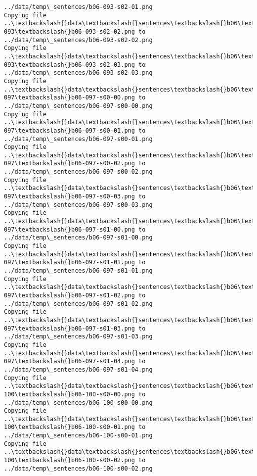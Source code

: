 \documentclass[11pt]{article}
\begin{document}
\begin{Verbatim}[commandchars=\\\{\}]
../data/temp\_sentences/b06-093-s02-01.png
Copying file ..\textbackslash{}data\textbackslash{}sentences\textbackslash{}b06\textbackslash{}b06-093\textbackslash{}b06-093-s02-02.png to
../data/temp\_sentences/b06-093-s02-02.png
Copying file ..\textbackslash{}data\textbackslash{}sentences\textbackslash{}b06\textbackslash{}b06-093\textbackslash{}b06-093-s02-03.png to
../data/temp\_sentences/b06-093-s02-03.png
Copying file ..\textbackslash{}data\textbackslash{}sentences\textbackslash{}b06\textbackslash{}b06-097\textbackslash{}b06-097-s00-00.png to
../data/temp\_sentences/b06-097-s00-00.png
Copying file ..\textbackslash{}data\textbackslash{}sentences\textbackslash{}b06\textbackslash{}b06-097\textbackslash{}b06-097-s00-01.png to
../data/temp\_sentences/b06-097-s00-01.png
Copying file ..\textbackslash{}data\textbackslash{}sentences\textbackslash{}b06\textbackslash{}b06-097\textbackslash{}b06-097-s00-02.png to
../data/temp\_sentences/b06-097-s00-02.png
Copying file ..\textbackslash{}data\textbackslash{}sentences\textbackslash{}b06\textbackslash{}b06-097\textbackslash{}b06-097-s00-03.png to
../data/temp\_sentences/b06-097-s00-03.png
Copying file ..\textbackslash{}data\textbackslash{}sentences\textbackslash{}b06\textbackslash{}b06-097\textbackslash{}b06-097-s01-00.png to
../data/temp\_sentences/b06-097-s01-00.png
Copying file ..\textbackslash{}data\textbackslash{}sentences\textbackslash{}b06\textbackslash{}b06-097\textbackslash{}b06-097-s01-01.png to
../data/temp\_sentences/b06-097-s01-01.png
Copying file ..\textbackslash{}data\textbackslash{}sentences\textbackslash{}b06\textbackslash{}b06-097\textbackslash{}b06-097-s01-02.png to
../data/temp\_sentences/b06-097-s01-02.png
Copying file ..\textbackslash{}data\textbackslash{}sentences\textbackslash{}b06\textbackslash{}b06-097\textbackslash{}b06-097-s01-03.png to
../data/temp\_sentences/b06-097-s01-03.png
Copying file ..\textbackslash{}data\textbackslash{}sentences\textbackslash{}b06\textbackslash{}b06-097\textbackslash{}b06-097-s01-04.png to
../data/temp\_sentences/b06-097-s01-04.png
Copying file ..\textbackslash{}data\textbackslash{}sentences\textbackslash{}b06\textbackslash{}b06-100\textbackslash{}b06-100-s00-00.png to
../data/temp\_sentences/b06-100-s00-00.png
Copying file ..\textbackslash{}data\textbackslash{}sentences\textbackslash{}b06\textbackslash{}b06-100\textbackslash{}b06-100-s00-01.png to
../data/temp\_sentences/b06-100-s00-01.png
Copying file ..\textbackslash{}data\textbackslash{}sentences\textbackslash{}b06\textbackslash{}b06-100\textbackslash{}b06-100-s00-02.png to
../data/temp\_sentences/b06-100-s00-02.png

\end{Verbatim}
\end{document}
